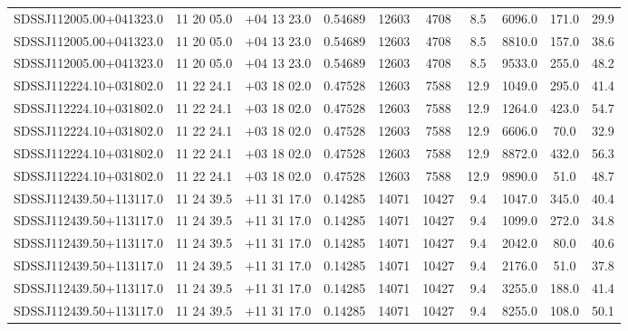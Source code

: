 \begin{landscape}
\begin{center}
\begin{longtable}{l c c c c c c c c c}
SDSSJ112005.00+041323.0  & 11 20 05.0  &         $+$04 13 23.0  &       0.54689  & 12603  &   4708  &       8.5  &       6096.0  &  171.0  &  29.9  \\
SDSSJ112005.00+041323.0  & 11 20 05.0  &         $+$04 13 23.0  &       0.54689  & 12603  &   4708  &       8.5  &       8810.0  &  157.0  &  38.6  \\
SDSSJ112005.00+041323.0  & 11 20 05.0  &         $+$04 13 23.0  &       0.54689  & 12603  &   4708  &       8.5  &       9533.0  &  255.0  &  48.2  \\
SDSSJ112224.10+031802.0  & 11 22 24.1  &         $+$03 18 02.0  &       0.47528  & 12603  &   7588  &       12.9  &      1049.0  &  295.0  &  41.4  \\
SDSSJ112224.10+031802.0  & 11 22 24.1  &         $+$03 18 02.0  &       0.47528  & 12603  &   7588  &       12.9  &      1264.0  &  423.0  &  54.7  \\
SDSSJ112224.10+031802.0  & 11 22 24.1  &         $+$03 18 02.0  &       0.47528  & 12603  &   7588  &       12.9  &      6606.0  &  70.0  &   32.9  \\
SDSSJ112224.10+031802.0  & 11 22 24.1  &         $+$03 18 02.0  &       0.47528  & 12603  &   7588  &       12.9  &      8872.0  &  432.0  &  56.3  \\
SDSSJ112224.10+031802.0  & 11 22 24.1  &         $+$03 18 02.0  &       0.47528  & 12603  &   7588  &       12.9  &      9890.0  &  51.0  &   48.7  \\
SDSSJ112439.50+113117.0  & 11 24 39.5  &         $+$11 31 17.0  &       0.14285  & 14071  &   10427  &      9.4  &       1047.0  &  345.0  &  40.4  \\
SDSSJ112439.50+113117.0  & 11 24 39.5  &         $+$11 31 17.0  &       0.14285  & 14071  &   10427  &      9.4  &       1099.0  &  272.0  &  34.8  \\
SDSSJ112439.50+113117.0  & 11 24 39.5  &         $+$11 31 17.0  &       0.14285  & 14071  &   10427  &      9.4  &       2042.0  &  80.0  &   40.6  \\
SDSSJ112439.50+113117.0  & 11 24 39.5  &         $+$11 31 17.0  &       0.14285  & 14071  &   10427  &      9.4  &       2176.0  &  51.0  &   37.8  \\
SDSSJ112439.50+113117.0  & 11 24 39.5  &         $+$11 31 17.0  &       0.14285  & 14071  &   10427  &      9.4  &       3255.0  &  188.0  &  41.4  \\
SDSSJ112439.50+113117.0  & 11 24 39.5  &         $+$11 31 17.0  &       0.14285  & 14071  &   10427  &      9.4  &       8255.0  &  108.0  &  50.1  \\

\end{longtable}
\end{center}
\end{landscape}
